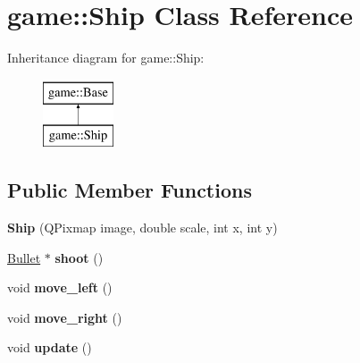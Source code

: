 \hypertarget{classgame_1_1Ship}{}\section{game\+:\+:Ship Class Reference}
\label{classgame_1_1Ship}
Inheritance diagram for game\+:\+:Ship\+:\begin{figure}[H]
\begin{center}
\leavevmode
\includegraphics[height=2.000000cm]{classgame_1_1Ship}
\end{center}
\end{figure}
\subsection*{Public Member Functions}
\begin{DoxyCompactItemize}
\item 
\mbox{\label{classgame_1_1Ship_a3231025c60af120a20baa522b1c0df74}} 
{\bfseries Ship} (Q\+Pixmap image, double scale, int x, int y)
\item 
\mbox{\label{classgame_1_1Ship_aaa41bdf4597826fd34508f1adaabebfb}} 
\hyperlink{classgame_1_1Bullet}{Bullet} $\ast$ {\bfseries shoot} ()
\item 
\mbox{\label{classgame_1_1Ship_ad736447878332280237bb94e92196132}} 
void {\bfseries move\+\_\+left} ()
\item 
\mbox{\label{classgame_1_1Ship_a139ad86e66b369dc9da2f7081f3205fb}} 
void {\bfseries move\+\_\+right} ()
\item 
\mbox{\label{classgame_1_1Ship_a35750fbe941502979040bddaaef24c7f}} 
void {\bfseries update} ()
\end{DoxyCompactItemize}

